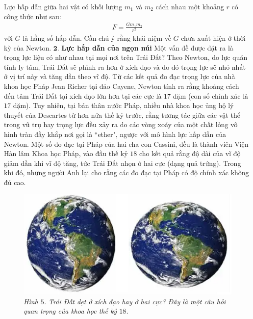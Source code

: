\begin{multicols}{2}
	\vskip 0.1cm
	Lực hấp dẫn giữa hai vật có khối lượng $m_1$ và $m_2$ cách nhau một khoảng $r$ có công thức như sau:
	\begin{align*}
		F =\frac{Gm_1m_2}{r^2}
	\end{align*}
	với $G$ là hằng số hấp dẫn. Cần chú ý rằng khái niệm về $G$ chưa xuất hiện ở thời kỳ của Newton.
	\vskip 0.1cm
	$\pmb{2.}$ \textbf{\color{timhieukhoahoc}Lực hấp dẫn của ngọn núi}
	\vskip 0.1cm
	Một vấn đề được đặt ra là trọng lực liệu có như nhau tại mọi nơi trên Trái Đất? Theo Newton, do lực quán tính ly tâm, Trái Đất sẽ phình ra hơn ở xích đạo và do đó trọng lực sẽ nhỏ nhất ở vị trí này và tăng dần theo vĩ độ. Từ các kết quả đo đạc trọng lực của nhà khoa học Pháp Jean Richer tại đảo Cayene, Newton tính ra rằng khoảng cách đến tâm Trái Đất tại xích đạo lớn hơn tại các cực là $17$ dặm (con số chính xác là $17$ dặm).
	\vskip 0.1cm
	Tuy nhiên, tại bản thân nước Pháp, nhiều nhà khoa học ủng hộ lý thuyết của Descartes từ hơn nửa thế kỷ trước, rằng tương tác giữa các vật thể trong vũ trụ hay trọng lực đều xảy ra do các vòng xoáy của một chất lỏng vô hình tràn đầy khắp nơi gọi là ``ether", ngược với mô hình lực hấp dẫn của Newton. Một số đo đạc tại Pháp của hai cha con Cassini, đều là thành viên Viện Hàn lâm Khoa học Pháp, vào đầu thế kỷ $18$ cho kết quả rằng độ dài của vĩ độ giảm dần khi vĩ độ tăng, tức Trái Đất nhọn ở hai cực (dạng quả trứng). Trong khi đó, những người Anh lại cho rằng các đo đạc tại Pháp có độ chính xác không đủ cao.
	\begin{figure}[H]
		\vspace*{-6pt}
		\centering
		\captionsetup{labelformat= empty, justification=centering}
		\includegraphics[width =1\linewidth]{5}
		\caption{\small\textit{\color{timhieukhoahoc}Hình $5$. Trái Đất dẹt ở xích đạo hay ở hai cực? Đây là một câu hỏi quan trọng của khoa học thế kỷ $18$.}}
		\vspace*{-10pt}

\end{figure}
\end{multicols}
